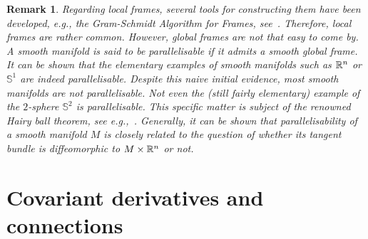 \documentclass[11pt,a4paper,twoside,openany]{report}
\theoremstyle{my-theorem}
\theoremstyle{non-theorem}
\newtheorem{remark}[theorem]{Remark}
\begin{document}
		\begin{remark}
			Regarding local frames, several tools for constructing them have been developed, e.g., the Gram-Schmidt Algorithm for Frames, see~\cite{lee:intro-to-smooth-manifolds}. Therefore, local frames are rather common. However, global frames are not that easy to come by. A smooth manifold is said to be \emph{parallelisable} if it admits a smooth global frame. It can be shown that the elementary examples of smooth manifolds such as ${\mathbb R}^n$ or $\mathbb S^1$ are indeed parallelisable. Despite this naive initial evidence, most smooth manifolds are not parallelisable. Not even the (still fairly elementary) example of the $2$-sphere $\mathbb S^2$ is parallelisable. This specific matter is subject of the renowned \emph{Hairy ball theorem}, see e.g.,~\cite{lee:manifolds-and-differential-geometry}. Generally, it can be shown that parallelisability of a smooth manifold $M$ is closely related to the question of whether its tangent bundle is diffeomorphic to $M \times {\mathbb R}^n$ or not.
		\end{remark}
		

	
	\chapter{Covariant derivatives and connections}
	\label{chap:covariant-derivatives-and-connections}
		
%		
\end{document}

